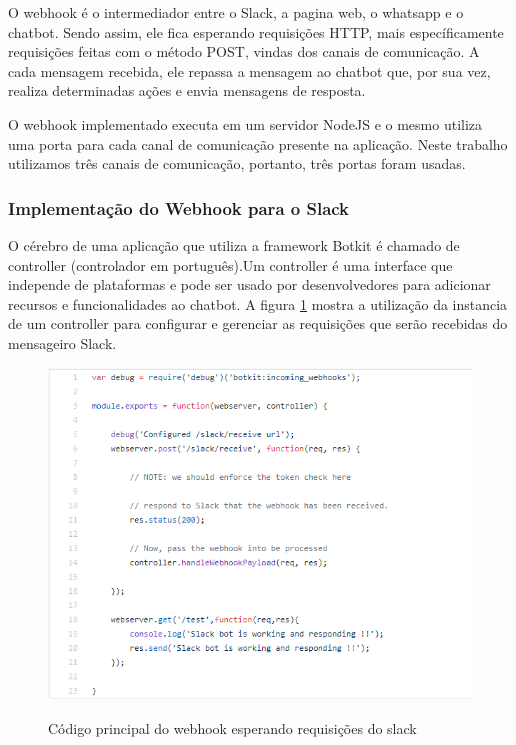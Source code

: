 O webhook é o intermediador entre o Slack, a pagina web, o whatsapp  e o chatbot. Sendo assim, ele fica esperando requisições HTTP, mais específicamente requisições feitas com o método POST, vindas dos canais de comunicação. A cada mensagem recebida, ele repassa a mensagem ao chatbot que, por sua vez, realiza determinadas ações e envia mensagens de resposta.

O webhook implementado executa em um servidor NodeJS e o mesmo utiliza uma porta para cada canal de comunicação presente na aplicação. Neste trabalho utilizamos três canais de comunicação, portanto, três portas foram usadas.

\subsubsection{Implementação do Webhook para o Slack}

O cérebro de uma aplicação que utiliza  a framework Botkit é chamado de controller (controlador em português).Um controller é uma interface que independe de plataformas e pode ser usado por desenvolvedores para adicionar recursos e funcionalidades ao chatbot. A figura \ref{fig:webhook_slack} mostra a utilização da instancia de um controller para configurar e gerenciar as requisições que serão recebidas do mensageiro Slack.

\begin{figure}[H]
  \centering
   \caption{Código principal do webhook esperando requisições do slack}
  \includegraphics[scale=0.8]{Imagens/webhook_slack.png} 
  \label{fig:webhook_slack}
\end{figure}


